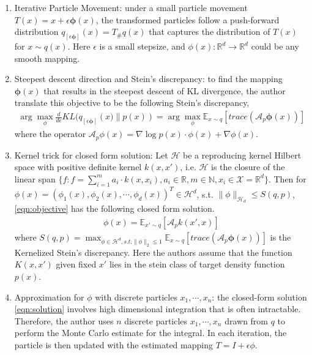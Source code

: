 \begin{enumerate}
    \item Iterative Particle Movement: under a small particle movement $T(x) = x + \epsilon \mathbf{\phi}(x)$, the transformed particles follow a push-forward distribution $q_{[\epsilon\mathbf{\phi}]}(x) = T_{\#}q(x)$ that captures the distribution of $T(x)$ for $x\sim q(x)$. Here $\epsilon$ is a small stepsize, and $\phi(x): \mathbb{R}^d\rightarrow \mathbb{R}^d$ could be any smooth mapping.
    \item Steepest descent direction and Stein's discrepancy: to find the mapping $\mathbf{\phi}(x)$ that results in the steepest descent of KL divergence, the author translate this objective to be the following Stein's discrepancy,
    \begin{align}
    \label{eqn:objective}
         \arg\max_\phi\frac{d}{d \epsilon}KL(q_{[\epsilon\mathbf{\phi}]}\left(x)\lVert p(x)\right) = \arg\max_\phi \mathbb{E}_{x\sim q}\left[trace\left(\mathcal{A}_p \mathbf{\phi}(x)\right)\right]
    \end{align}
    where the operator $\mathcal{A}_p \phi(x)= \nabla \log p(x) \cdot \phi(x) + \nabla\phi(x)$.
    \item Kernel trick for closed form solution: Let $\mathcal{H}$ be a reproducing kernel Hilbert space with positive definite kernel $k(x,x')$, i.e. $\mathcal{H}$ is the closure of the linear span $\{f: f = \sum_{i=1}^m a_i \cdot k(x, x_i), a_i\in \mathbb{R}, m\in \mathbb{N}, x_i\in \mathcal{X}=\mathbb{R}^d \}$. Then for $\phi(x) = \left(\phi_1(x), \phi_2(x), \cdots, \phi_d(x)\right)^T \in \mathcal{H}^d$, s.t. $\lVert\phi\rVert_{\mathcal{H}_d}\leq S(q, p)$, \eqref{eqn:objective}  has the following closed form solution.
    \begin{align}
    \label{eqn:solution}
        \phi(x) = \mathbb{E}_{x'\sim q}\left[ \mathcal{A}_p k(x', x) \right]
    \end{align}
    where $S(q, p) = \max_{\phi\in \mathcal{H}^d, s.t. \lVert\phi\rVert_2\leq 1} \mathbb{E}_{x\sim q}\left[trace\left(\mathcal{A}_p \mathbf{\phi}(x)\right)\right]$ is the Kernelized Stein's discrepancy. Here the authors assume that the function $K(x, x')$ given fixed $x'$ lies in the stein class of target density function $p(x)$.
    \item Approximation for $\phi$ with discrete particles $x_1, \cdots, x_n$: the closed-form solution \eqref{eqn:solution} involves high dimensional integration that is often intractable. Therefore, the author uses $n$ discrete particles $x_1, \cdots, x_n$ drawn from $q$ to perform the Monte Carlo estimate for the integral. In each iteration, the particle is then updated with the estimated mapping $T = I + \epsilon \phi$.
\end{enumerate}


